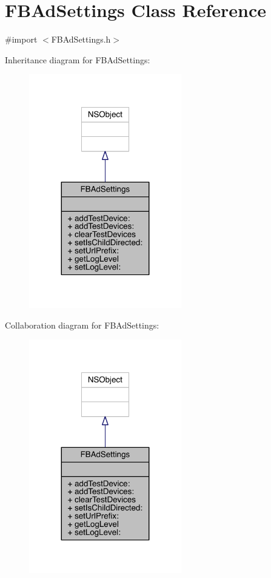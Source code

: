 \hypertarget{interface_f_b_ad_settings}{\section{F\-B\-Ad\-Settings Class Reference}
\label{interface_f_b_ad_settings}
}


{\ttfamily \#import $<$F\-B\-Ad\-Settings.\-h$>$}



Inheritance diagram for F\-B\-Ad\-Settings\-:
\nopagebreak
\begin{figure}[H]
\begin{center}
\leavevmode
\includegraphics[width=188pt]{interface_f_b_ad_settings__inherit__graph}
\end{center}
\end{figure}


Collaboration diagram for F\-B\-Ad\-Settings\-:
\nopagebreak
\begin{figure}[H]
\begin{center}
\leavevmode
\includegraphics[width=188pt]{interface_f_b_ad_settings__coll__graph}
\end{center}
\end{figure}
